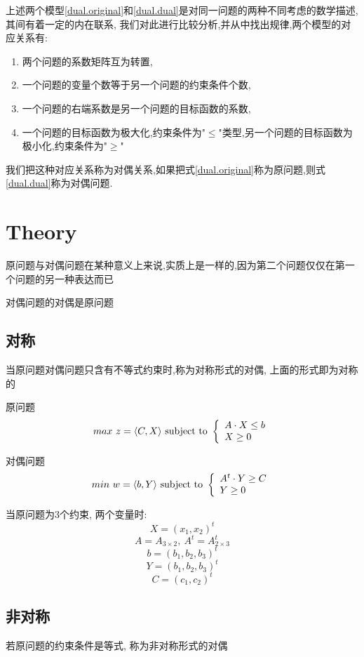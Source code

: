 上述两个模型\eqref{dual.original}和\eqref{dual.dual}是对同一问题的两种不同考虑的数学描述,其间有着一定的内在联系,
我们对此进行比较分析,并从中找出规律,两个模型的对应关系有:
\begin{enumerate}
\item 两个问题的系数矩阵互为转置,
\item 一个问题的变量个数等于另一个问题的约束条件个数,
\item 一个问题的右端系数是另一个问题的目标函数的系数,
\item 一个问题的目标函数为极大化,约束条件为"$\leq$"类型,另一个问题的目标函数为极小化,约束条件为"$\geq$"
\end{enumerate}
我们把这种对应关系称为对偶关系,如果把式\eqref{dual.original}称为原问题,则式\eqref{dual.dual}称为对偶问题.

\section{Theory}
原问题与对偶问题在某种意义上来说,实质上是一样的,因为第二个问题仅仅在第一个问题的另一种表达而已

对偶问题的对偶是原问题

\subsection{对称}
当原问题对偶问题只含有不等式约束时,称为对称形式的对偶, 上面的形式即为对称的

原问题
\begin{equation}
max\ z = \langle C , X\rangle
\mbox{ subject to }
\left\{
  \begin{array}{ll}
	  A \cdot X \leq b \\
		X \geq 0
  \end{array}
\right.
\label{dual.model.ori}
\end{equation}

对偶问题
\begin{equation}
min\ w = \langle b , Y\rangle
\mbox{ subject to }
\left\{
  \begin{array}{ll}
		A^t \cdot Y \geq C \\
		Y \geq 0
  \end{array}
\right.
\label{dual.model.dual}
\end{equation}

当原问题为3个约束, 两个变量时:
$$X=(x_1, x_2)^t$$
$$A = A_{3 \times 2},\ A^t = A^t_{2 \times 3}$$
$$b = (b_1, b_2, b_3)^t$$
$$Y = (b_1, b_2, b_3)^t$$
$$C=(c_1, c_2)^t$$

\subsection{非对称}
若原问题的约束条件是等式, 称为非对称形式的对偶

